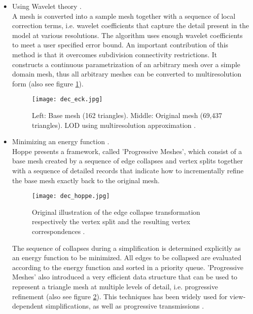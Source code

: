 \begin{itemize}
    \item Using Wavelet theory \citep[cf.][]{Eck1995}.\\
A mesh is converted into a sample mesh together with a sequence of local correction terms, i.e. wavelet coefficients that capture the detail present in the model at various resolutions. The algorithm uses enough wavelet coefficients to meet a user specified error
bound. An important contribution of this method is that it overcomes subdivision connectivity restrictions. It constructs a continuous parametrization of an arbitrary mesh over a simple domain mesh, thus all arbitrary meshes can be converted to multiresolution form (also see figure \ref{fig:dec_eck}).
\begin{figure}[ht]
\centering
\texttt{[image: dec\_eck.jpg]}
\caption{Left: Base mesh (162 triangles). Middle: Original mesh (69,437 triangles). LOD using multiresolution approximation \citep[][p.181]{Eck1995}.}
\label{fig:dec_eck}
\end{figure}

    \item Minimizing an energy function \citep[cf.][]{Hoppe1996}.\\
Hoppe presents a framework, called 'Progressive Meshes', which consist of a base mesh created by a sequence of edge collapses and vertex splits together with a sequence of detailed records that indicate how to incrementally refine the base mesh exactly back to the original mesh.
\begin{figure}[ht]
\centering
\texttt{[image: dec\_hoppe.jpg]}
\caption{Original illustration of the edge collapse transformation respectively the vertex split and the resulting vertex correspondences \citep[][p.100]{Hoppe1996}.}
\label{fig:dec_hoppe}
\end{figure}
The sequence of collapses during a simplification is determined explicitly as an energy function to be minimized.
All edges to be collapsed are evaluated according to the energy function and sorted in a priority queue.
'Progressive Meshes' also introduced a very efficient data structure that can be used to represent a triangle mesh at multiple levels of detail, i.e. progressive refinement (also see figure \ref{fig:dec_hoppe}).
This techniques has been widely used for view-dependent simplifications, as well as progressive transmissions \citep[cf.][]{Bajaj1999}.


\end{itemize}
